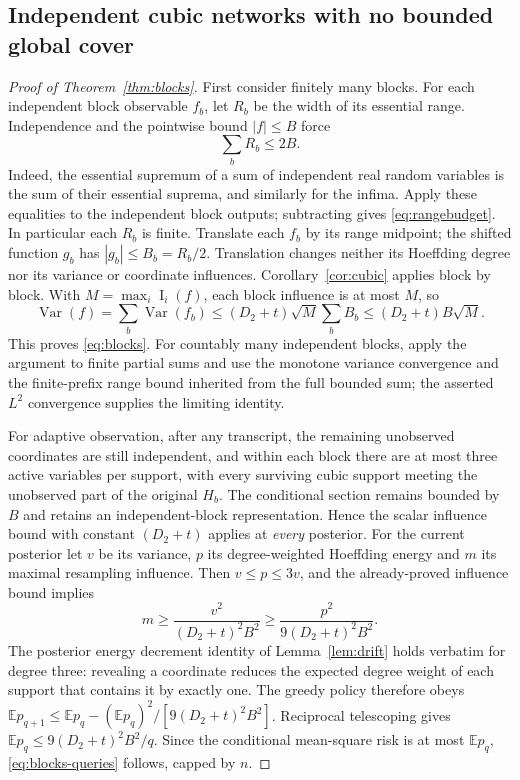 \documentclass[11pt,letterpaper]{article}
\theoremstyle{definition}
\newcommand{\E}{\mathbb E}
\newcommand{\Var}{\operatorname{Var}}
\newcommand{\Inf}{\operatorname{I}}
\begin{document}
\subsection{Independent cubic networks with no bounded global cover}
\begin{proof}[Proof of Theorem~\ref{thm:blocks}]
First consider finitely many blocks. For each independent block
observable $f_b$, let $R_b$ be the width of its essential range.
Independence and the pointwise bound $|f|\le B$ force
\begin{equation}\label{eq:rangebudget}
\sum_b R_b\le2B.
\end{equation}
Indeed, the essential supremum of a sum of independent real random
variables is the sum of their essential suprema, and similarly for
the infima. Apply these equalities to the independent block outputs;
subtracting gives \eqref{eq:rangebudget}. In particular each $R_b$
is finite. Translate each $f_b$ by its range midpoint; the shifted
function $g_b$ has $|g_b|\le B_b=R_b/2$. Translation changes neither
its Hoeffding degree nor its variance or coordinate influences.
Corollary~\ref{cor:cubic} applies block by block. With
$M=\max_i\Inf_i(f)$, each block influence is at most $M$, so
\[
\Var(f)=\sum_b\Var(f_b)
\le (D_2+t)\sqrt M\sum_b B_b
\le(D_2+t)B\sqrt M.
\]
This proves \eqref{eq:blocks}. For countably many independent blocks,
apply the argument to finite partial sums and use the monotone
variance convergence and the finite-prefix range bound inherited
from the full bounded sum; the asserted $L^2$ convergence supplies
the limiting identity.

For adaptive observation, after any transcript, the remaining
unobserved coordinates are still independent, and within each block
there are at most three active variables per support, with every
surviving cubic support meeting the unobserved part of the original
$H_b$. The conditional section remains bounded by $B$ and retains
an independent-block representation. Hence the scalar influence
bound with constant $(D_2+t)$ applies at \emph{every} posterior.
For the current posterior let $v$ be its variance, $p$ its
degree-weighted Hoeffding energy and $m$ its maximal resampling
influence. Then $v\le p\le3v$, and the already-proved influence
bound implies
\[m\ge\frac{v^2}{(D_2+t)^2B^2}
\ge\frac{p^2}{9(D_2+t)^2B^2}.\]
The posterior energy decrement identity of
Lemma~\ref{lem:drift} holds verbatim for degree three: revealing a
coordinate reduces the expected degree weight of each support that
contains it by exactly one. The greedy policy therefore obeys
$\E p_{q+1}\le\E p_q-(\E p_q)^2/[9(D_2+t)^2B^2]$.
Reciprocal telescoping gives $\E p_q\le9(D_2+t)^2B^2/q$.
Since the conditional mean-square risk is at most $\E p_q$,
\eqref{eq:blocks-queries} follows, capped by $n$.
\end{proof}
\end{document}
